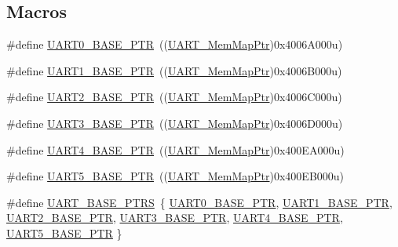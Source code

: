 \subsection*{Macros}
\begin{DoxyCompactItemize}
\item 
\#define \hyperlink{group___u_a_r_t___peripheral_ga50a02c91ffbd11fa7b4f0c33fe585199}{U\+A\+R\+T0\+\_\+\+B\+A\+S\+E\+\_\+\+P\+T\+R}~((\hyperlink{group___u_a_r_t___peripheral_ga306cf44b593fadbb29a065f42e3f68f0}{U\+A\+R\+T\+\_\+\+Mem\+Map\+Ptr})0x4006\+A000u)
\item 
\#define \hyperlink{group___u_a_r_t___peripheral_gafb5b1236c1cdf2d9a6464251b791030c}{U\+A\+R\+T1\+\_\+\+B\+A\+S\+E\+\_\+\+P\+T\+R}~((\hyperlink{group___u_a_r_t___peripheral_ga306cf44b593fadbb29a065f42e3f68f0}{U\+A\+R\+T\+\_\+\+Mem\+Map\+Ptr})0x4006\+B000u)
\item 
\#define \hyperlink{group___u_a_r_t___peripheral_ga75ca2ea4e490b3c1c7aa55fc9c25cd37}{U\+A\+R\+T2\+\_\+\+B\+A\+S\+E\+\_\+\+P\+T\+R}~((\hyperlink{group___u_a_r_t___peripheral_ga306cf44b593fadbb29a065f42e3f68f0}{U\+A\+R\+T\+\_\+\+Mem\+Map\+Ptr})0x4006\+C000u)
\item 
\#define \hyperlink{group___u_a_r_t___peripheral_gadf42d0466618b9209401839e1af9b3c4}{U\+A\+R\+T3\+\_\+\+B\+A\+S\+E\+\_\+\+P\+T\+R}~((\hyperlink{group___u_a_r_t___peripheral_ga306cf44b593fadbb29a065f42e3f68f0}{U\+A\+R\+T\+\_\+\+Mem\+Map\+Ptr})0x4006\+D000u)
\item 
\#define \hyperlink{group___u_a_r_t___peripheral_ga680f97e081544c697ee071702b2de587}{U\+A\+R\+T4\+\_\+\+B\+A\+S\+E\+\_\+\+P\+T\+R}~((\hyperlink{group___u_a_r_t___peripheral_ga306cf44b593fadbb29a065f42e3f68f0}{U\+A\+R\+T\+\_\+\+Mem\+Map\+Ptr})0x400\+E\+A000u)
\item 
\#define \hyperlink{group___u_a_r_t___peripheral_gace0110558cde93abab79b033e3caf755}{U\+A\+R\+T5\+\_\+\+B\+A\+S\+E\+\_\+\+P\+T\+R}~((\hyperlink{group___u_a_r_t___peripheral_ga306cf44b593fadbb29a065f42e3f68f0}{U\+A\+R\+T\+\_\+\+Mem\+Map\+Ptr})0x400\+E\+B000u)
\item 
\#define \hyperlink{group___u_a_r_t___peripheral_ga7b34a38b9492a1e1007b2f66383aef17}{U\+A\+R\+T\+\_\+\+B\+A\+S\+E\+\_\+\+P\+T\+R\+S}~\{ \hyperlink{group___u_a_r_t___peripheral_ga50a02c91ffbd11fa7b4f0c33fe585199}{U\+A\+R\+T0\+\_\+\+B\+A\+S\+E\+\_\+\+P\+T\+R}, \hyperlink{group___u_a_r_t___peripheral_gafb5b1236c1cdf2d9a6464251b791030c}{U\+A\+R\+T1\+\_\+\+B\+A\+S\+E\+\_\+\+P\+T\+R}, \hyperlink{group___u_a_r_t___peripheral_ga75ca2ea4e490b3c1c7aa55fc9c25cd37}{U\+A\+R\+T2\+\_\+\+B\+A\+S\+E\+\_\+\+P\+T\+R}, \hyperlink{group___u_a_r_t___peripheral_gadf42d0466618b9209401839e1af9b3c4}{U\+A\+R\+T3\+\_\+\+B\+A\+S\+E\+\_\+\+P\+T\+R}, \hyperlink{group___u_a_r_t___peripheral_ga680f97e081544c697ee071702b2de587}{U\+A\+R\+T4\+\_\+\+B\+A\+S\+E\+\_\+\+P\+T\+R}, \hyperlink{group___u_a_r_t___peripheral_gace0110558cde93abab79b033e3caf755}{U\+A\+R\+T5\+\_\+\+B\+A\+S\+E\+\_\+\+P\+T\+R} \}
\end{DoxyCompactItemize}
